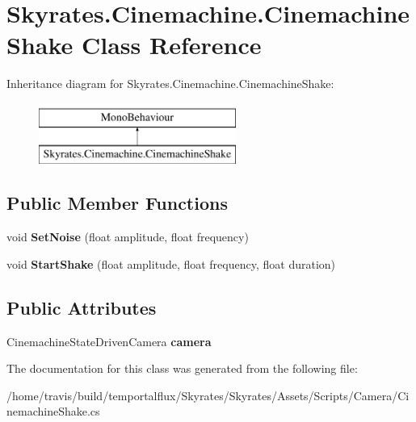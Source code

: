 \hypertarget{class_skyrates_1_1_cinemachine_1_1_cinemachine_shake}{\section{Skyrates.\-Cinemachine.\-Cinemachine\-Shake Class Reference}
\label{class_skyrates_1_1_cinemachine_1_1_cinemachine_shake}
}
Inheritance diagram for Skyrates.\-Cinemachine.\-Cinemachine\-Shake\-:\begin{figure}[H]
\begin{center}
\leavevmode
\includegraphics[height=2.000000cm]{class_skyrates_1_1_cinemachine_1_1_cinemachine_shake}
\end{center}
\end{figure}
\subsection*{Public Member Functions}
\begin{DoxyCompactItemize}
\item 
\hypertarget{class_skyrates_1_1_cinemachine_1_1_cinemachine_shake_a910f07483c1c3a6849b7dac0d9cb9f0a}{void {\bfseries Set\-Noise} (float amplitude, float frequency)}\label{class_skyrates_1_1_cinemachine_1_1_cinemachine_shake_a910f07483c1c3a6849b7dac0d9cb9f0a}

\item 
\hypertarget{class_skyrates_1_1_cinemachine_1_1_cinemachine_shake_a4e90f761409baaa481a0fd66e79f1089}{void {\bfseries Start\-Shake} (float amplitude, float frequency, float duration)}\label{class_skyrates_1_1_cinemachine_1_1_cinemachine_shake_a4e90f761409baaa481a0fd66e79f1089}

\end{DoxyCompactItemize}
\subsection*{Public Attributes}
\begin{DoxyCompactItemize}
\item 
\hypertarget{class_skyrates_1_1_cinemachine_1_1_cinemachine_shake_a673ef2956e34c6d0aacc1d59123b4536}{Cinemachine\-State\-Driven\-Camera {\bfseries camera}}\label{class_skyrates_1_1_cinemachine_1_1_cinemachine_shake_a673ef2956e34c6d0aacc1d59123b4536}

\end{DoxyCompactItemize}


The documentation for this class was generated from the following file\-:\begin{DoxyCompactItemize}
\item 
/home/travis/build/temportalflux/\-Skyrates/\-Skyrates/\-Assets/\-Scripts/\-Camera/Cinemachine\-Shake.\-cs\end{DoxyCompactItemize}

